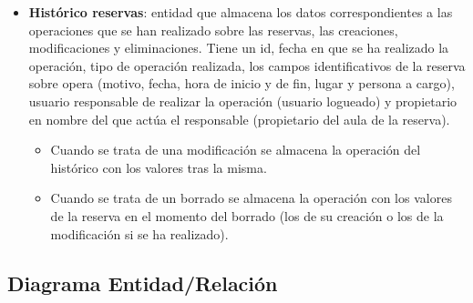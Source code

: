 \begin{itemize}
    \item \textbf{Histórico reservas}: entidad que almacena los datos correspondientes a las operaciones que se han realizado sobre las reservas, las creaciones, modificaciones y eliminaciones. Tiene un id, fecha en que se ha realizado la operación, tipo de operación realizada, los campos identificativos de la reserva sobre opera (motivo, fecha, hora de inicio y de fin, lugar y persona a cargo), usuario responsable de realizar la operación (usuario logueado) y propietario en nombre del que actúa el responsable (propietario del aula de la reserva).
    
    \begin{itemize}
        \item Cuando se trata de una modificación se almacena la operación del histórico con los valores tras la misma.
        
        \item Cuando se trata de un borrado se almacena la operación con los valores de la reserva en el momento del borrado (los de su creación o los de la modificación si se ha realizado).
    \end{itemize}
\end{itemize}

\begin{landscape}
\subsection{Diagrama Entidad/Relación}
\end{landscape}

